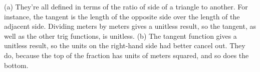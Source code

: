 (a) They're all defined in terms of the ratio of side of a triangle
to another. For instance, the tangent is the length of the opposite
side over the length of the adjacent side. Dividing meters by meters
gives a unitless result, so the tangent, as well as the other trig
functions, is unitless.
(b) The tangent function gives a unitless result, so the units
on the right-hand side had better cancel out. They do,
because the top of the fraction has units of meters squared,
and so does the bottom.



